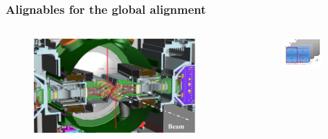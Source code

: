 \documentclass[aspectratio=1610, 12pt, xcolor=dvipsnames]{beamer}
\begin{document}
\begin{frame}\frametitle{Alignables for the global alignment}
  \begin{columns}
    \begin{column}[c]{0.5\textwidth}
      \begin{figure}
        \centering
        \includegraphics[width=0.9\textwidth]{plots/velo_halves.png}
      \end{figure}
    \end{column}
    \begin{column}{0.5\textwidth}
      \begin{figure}
        \centering
        \includegraphics[width=0.9\textwidth]{plots/scifi_modell.png}
      \end{figure}
    \end{column}
  \end{columns}
\end{frame}
\end{document}
